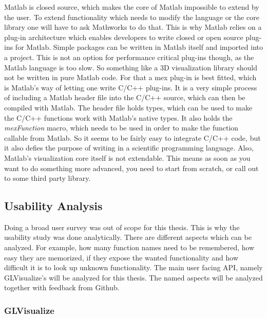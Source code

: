 Matlab is closed source, which makes the core of Matlab impossible to extend by the user. 
To extend functionality which needs to modify the language or the core library one will have to ask Mathworks to do that.
This is why Matlab relies on a plug-in architecture which enables developers to write closed or open source plug-ins for Matlab. 
Simple packages can be written in Matlab itself and imported into a project.
This is not an option for performance critical plug-ins though, as the Matlab language is too slow.
So something like a 3D visualization library should not be written in pure Matlab code.
For that a mex plug-in is best fitted, which is Matlab's way of letting one write C/C++ plug-ins.
It is a very simple process of including a Matlab header file into the C/C++ source, which can then be compiled with Matlab.
The header file holds types, which can be used to make the C/C++ functions work with Matlab's native types.
It also holds the \textit{mexFunction} macro, which needs to be used in order to make the function callable from Matlab.
So it seems to be fairly easy to integrate C/C++ code, but it also defies the purpose of writing in a scientific programming language.
Also, Matlab's visualization core itself is not extendable. This means as soon as you want to do something more advanced, you need to start from scratch, or call out to some third party library.


\subsection{Usability Analysis}
Doing a broad user survey was out of scope for this thesis.
This is why the usability study was done analytically.
There are different aspects which can be analyzed. For example, how many function names need to be remembered, how easy they are memorized, if they expose the wanted functionality and how difficult it is to look up unknown functionality.
The main user facing \ac{API}, namely GLVisualize’s will be analyzed for this thesis. 
The named aspects will be analyzed together with feedback from Github.

\subsubsection{GLVisualize}

